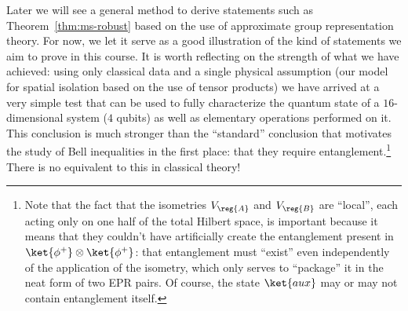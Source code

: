 Later we will see a general method to derive statements such as Theorem~\ref{thm:ms-robust} based on the use of approximate group representation theory. For now, we let it serve as a good illustration of the kind of statements we aim to prove in this course. It is worth reflecting on the strength of what we have achieved: using only classical data and a single physical assumption (our model for spatial isolation based on the use of tensor products) we have arrived at a very simple test that can be used to fully characterize the quantum state of a $16$-dimensional system ($4$ qubits) as well as elementary operations performed on it. This conclusion is much stronger than the ``standard'' conclusion that motivates the study of Bell inequalities in the first place: that they require entanglement.\footnote{Note that the fact that the isometries $V_\reg{A}$ and $V_\reg{B}$ are ``local'', each acting only on one half of the total Hilbert space, is important because it means that they couldn't have artificially create the entanglement present in $\ket{\phi^+}\otimes \ket{\phi^+}$: that entanglement must ``exist'' even independently of the application of the isometry, which only serves to ``package'' it in the neat form of two EPR pairs. Of course, the state $\ket{aux}$ may or may not contain entanglement itself.}
There is no equivalent to this in classical theory! 
